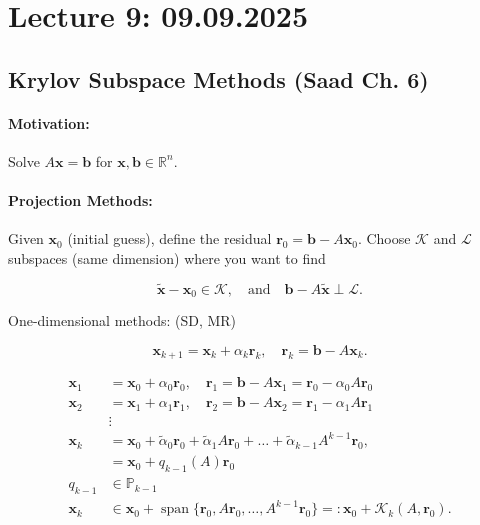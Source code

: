 \section{Lecture 9: 09.09.2025}

\subsection{Krylov Subspace Methods (Saad Ch. 6)}
\paragraph{Motivation:}
Solve $A\mathbf{x} = \mathbf{b}$ for $\mathbf{x}, \mathbf{b} \in \mathbb{R}^n$.

\paragraph{Projection Methods:}
Given $\mathbf{x}_0$ (initial guess), define the residual $\mathbf{r}_0 = \mathbf{b} - A\mathbf{x}_0$.
Choose $\mathcal{K}$ and $\mathcal{L}$ subspaces (same dimension) where you want to find

\[
    \tilde{\mathbf{x}} - \mathbf{x}_0 \in \mathcal{K}, \quad \text{and} \quad \mathbf{b} - A\tilde{\mathbf{x}} \perp \mathcal{L}.
\]

One-dimensional methods: (SD, MR)

\[
    \mathbf{x}_{k+1} = \mathbf{x}_k + \alpha_k \mathbf{r}_k, \quad \mathbf{r}_k = \mathbf{b} - A\mathbf{x}_k.
\]

\begin{align*}
    \mathbf{x}_{1} & = \mathbf{x}_0 + \alpha_0 \mathbf{r}_0, \quad \mathbf{r}_1 = \mathbf{b} - A\mathbf{x}_1 = \mathbf{r}_0 - \alpha_0 A\mathbf{r}_0                      \\
    \mathbf{x}_{2} & = \mathbf{x}_1 + \alpha_1 \mathbf{r}_1, \quad \mathbf{r}_2 = \mathbf{b} - A\mathbf{x}_2 = \mathbf{r}_1 - \alpha_1 A\mathbf{r}_1                      \\
                   & \vdots                                                                                                                                               \\
    \mathbf{x}_{k} & = \mathbf{x}_0 + \tilde{\alpha}_0 \mathbf{r}_0 + \tilde{\alpha}_1 A\mathbf{r}_0 + \ldots + \tilde{\alpha}_{k-1} A^{k-1}\mathbf{r}_0,                 \\
                   & = \mathbf{x}_0 + q_{k-1}(A)\mathbf{r}_0
    \\q_{k-1} &\in \mathbb{P}_{k-1} \\
    \mathbf{x}_{k} & \in \mathbf{x}_0 + \operatorname{span}\{\mathbf{r}_0, A\mathbf{r}_0, \ldots, A^{k-1}\mathbf{r}_0\} =: \mathbf{x}_0 + \mathcal{K}_k(A, \mathbf{r}_0).
\end{align*}

